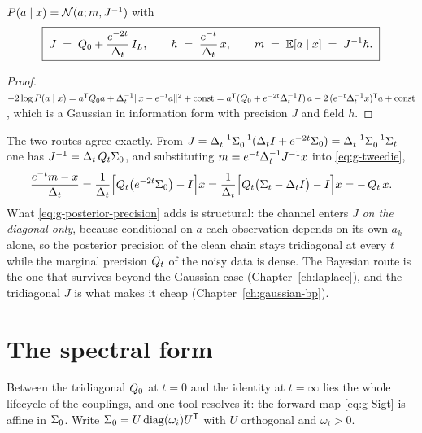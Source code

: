 \begin{proposition}\label{prop:g-posterior}
$P(a \mid x) = \mathcal{N}(a; m, J^{-1})$ with
\begin{equation}
  \boxed{\;
  J \;=\; Q_0 + \frac{e^{-2t}}{\Delta_t}\,I_{L},
  \qquad
  h \;=\; \frac{e^{-t}}{\Delta_t}\,x,
  \qquad
  m \;=\; \mathbb{E}[a \mid x] \;=\; J^{-1} h .
  \;}
  \label{eq:g-posterior-precision}
\end{equation}
\end{proposition}

\begin{proof}
$-2\log P(a\mid x) = a^{\mathsf{T}}Q_0 a + \Delta_t^{-1}\|x - e^{-t}a\|^2 + \mathrm{const}
= a^{\mathsf{T}} (Q_0 + e^{-2t}\Delta_t^{-1} I)\, a - 2\,(e^{-t}\Delta_t^{-1}x)^{\mathsf{T}} a +
\mathrm{const}$, which is a Gaussian in information form with precision $J$
and field $h$.
\end{proof}

The two routes agree exactly. From $J = \Delta_t^{-1}\Sigma_0^{-1}(\Delta_t I +
e^{-2t}\Sigma_0) = \Delta_t^{-1}\Sigma_0^{-1}\Sigma_t$ one has $J^{-1} = \Delta_t\,Q_t\Sigma_0$,
and substituting $m = e^{-t}\Delta_t^{-1}J^{-1}x$ into \eqref{eq:g-tweedie},
\begin{equation}
  \frac{e^{-t} m - x}{\Delta_t}
  = \frac{1}{\Delta_t}\Big[Q_t\big(e^{-2t}\Sigma_0\big) - I\Big]x
  = \frac{1}{\Delta_t}\Big[Q_t\big(\Sigma_t - \Delta_t I\big) - I\Big]x
  = -\,Q_t\,x .
  \label{eq:g-two-score-routes}
\end{equation}
What \eqref{eq:g-posterior-precision} adds is structural: the channel enters
$J$ \emph{on the diagonal only}, because conditional on $a$ each observation
depends on its own $a_k$ alone, so the posterior precision of the clean chain
stays tridiagonal at every $t$ while the marginal precision $Q_t$ of the
noisy data is dense. The Bayesian route is the one that survives beyond the
Gaussian case (Chapter~\ref{ch:laplace}), and the tridiagonal $J$ is what
makes it cheap (Chapter~\ref{ch:gaussian-bp}).

\section{The spectral form}
\label{sec:g-lifecycle}

Between the tridiagonal $Q_0$ at $t=0$ and the identity at $t=\infty$ lies the
whole lifecycle of the couplings, and one tool resolves it: the forward map
\eqref{eq:g-Sigt} is affine in $\Sigma_0$. Write $\Sigma_0 = U\operatorname{diag}(\omega_i)U^{\mathsf{T}}$
with $U$ orthogonal and $\omega_i > 0$.

